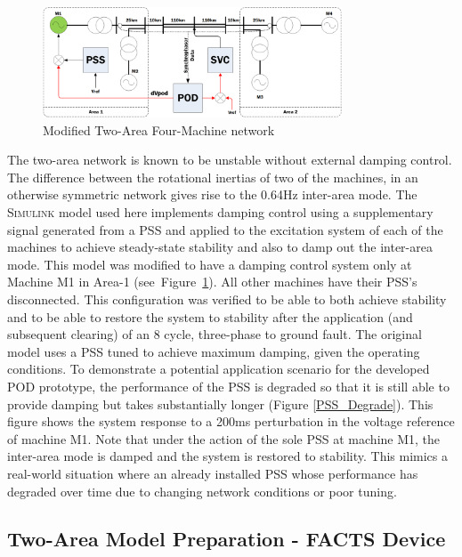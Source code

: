 \documentclass[journal]{IEEEtran}
\begin{document}
\begin{figure}[!th]
\centering
\includegraphics[width=3.5in]{Kundur2Area_outline_multi.png}
\caption{Modified Two-Area Four-Machine network}
\label{NetworkOutline}
\end{figure}

The two-area network \cite{KundurTwoArea} is known to be unstable without external damping control. The difference between the rotational inertias of two of the machines, in an otherwise symmetric network gives rise to the 0.64Hz inter-area mode. The \textsc{Simulink} model used here implements damping control using a supplementary signal generated from a PSS and applied to the excitation system of each of the machines to achieve steady-state stability and also to damp out the inter-area mode. This model was modified to have a damping control system only at Machine M1 in Area-1 (see~Figure~\ref{NetworkOutline}). All other machines have their PSS's disconnected. This configuration was  verified to be able to both achieve stability and to be able to restore the system to stability after the application (and subsequent clearing) of an 8 cycle, three-phase to ground fault. The original model uses a PSS tuned to achieve maximum damping, given the operating conditions. To demonstrate a potential application scenario for the developed POD prototype, the performance of the PSS is degraded so that it is still able to provide damping but takes substantially longer (Figure \ref{PSS_Degrade}). This figure shows the system response to a 200ms perturbation in the voltage reference of machine M1. Note that under the action of the sole PSS at machine M1, the inter-area mode is damped and the system is restored to stability. This mimics a real-world situation where an already installed PSS whose performance has degraded over time due to changing network conditions or poor tuning.\\


\subsection{Two-Area Model Preparation - FACTS Device}
\end{document}
